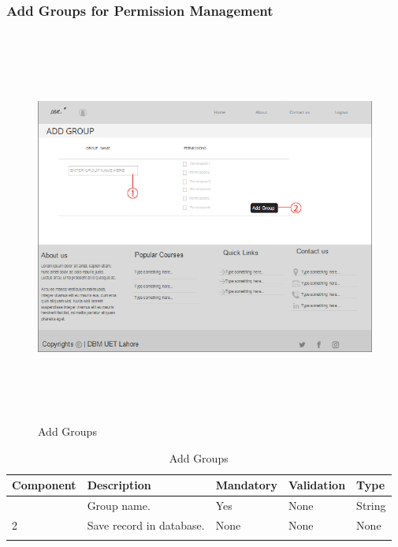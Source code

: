 \documentclass[12pt]{article}
\begin{document}
\subsubsection{Add Groups for Permission Management}
\begin{figure}[h]
  \centering
  \includegraphics[width=12cm, height=13cm]{AddGroups(Admin)}
  \caption{Add Groups}
\end{figure}
\begin{longtable}{|>{\raggedright\arraybackslash}p{2.5cm}|>{\raggedright\arraybackslash}p{4cm}|>{\raggedright\arraybackslash}p{2.2cm}|>{\raggedright\arraybackslash}p{2cm}|>{\raggedright\arraybackslash}p{2cm}|}
\hline
\textbf{Component} & \textbf{Description} & \textbf{Mandatory} & \textbf{Validation} & \textbf{Type}\\
\hline
1 &
Group name. &
Yes &
None &
String \\
\hline

2 &
Save record in database. &
None &
None &
None \\
\hline

\caption{Add Groups}
\end{longtable}

\newpage
\end{document}
